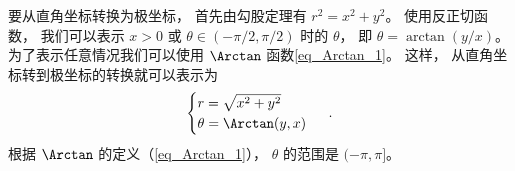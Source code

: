 要从直角坐标转换为极坐标， 首先由勾股定理有 $r^2 = x^2 + y^2$。 使用反正切函数， 我们可以表示 $x >0$ 或 $\theta\in(-\pi/2,\pi/2)$ 时的 $\theta$， 即 $\theta = \arctan(y/x)$。 为了表示任意情况我们可以使用 $\Arctan$ 函数\autoref{eq_Arctan_1}。 这样， 从直角坐标转到极坐标的转换就可以表示为
\begin{equation}\label{eq_Polar_4}
\begin{cases}
r = \sqrt{x^2 + y^2}\\
\theta = \Arctan(y, x)
\end{cases}~.
\end{equation}
根据 $\Arctan$ 的定义（\autoref{eq_Arctan_1}）， $\theta$ 的范围是 $(-\pi, \pi]$。
